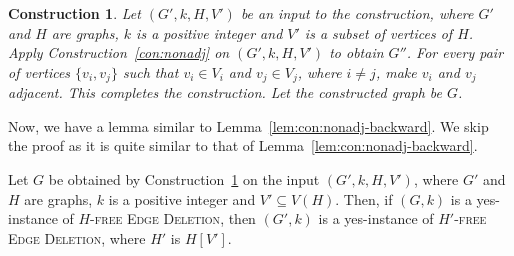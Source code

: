\documentclass[envcountsame,envcountsect,10pt,oribibl]{llncs}
\newcommand{\pname}[1]{\textnormal{\textsc{#1}}}
\newcommand{\HED}{\pname{$H$-free Edge Deletion}}
\newcommand{\HDED}{\pname{$H'$-free Edge Deletion}}
\newtheorem{construction}{Construction}
\begin{document}
\begin{construction}
  \label{con:adj}
  Let $(G',k, H, V')$ be an input to the construction, where $G'$ and $H$ are graphs, $k$
  is a positive integer and $V'$ is a subset of vertices of $H$.
  Apply Construction~\ref{con:nonadj} on $(G',k,H,V')$ to obtain $G''$.
  For every pair of vertices $\{v_i,v_j\}$ such that $v_i\in V_i$ and $v_j\in V_j$, where $i\neq j$,
  make $v_i$ and $v_j$ adjacent.
  This completes the construction. Let the constructed graph be $G$. 
\end{construction}

Now, we have a lemma similar to Lemma~\ref{lem:con:nonadj-backward}. 
We skip the proof as it is quite similar to that of Lemma~\ref{lem:con:nonadj-backward}. 

\begin{lemma}
  \label{lem:con:adj-backward}
  Let $G$ be obtained by Construction~\ref{con:adj} on 
  the input $(G',k,H,V')$, where $G'$ and $H$ are graphs, $k$ is a positive integer and $V'\subseteq V(H)$.
  Then, if $(G,k)$ is a yes-instance of \HED, then $(G',k)$ is a yes-instance of \HDED, where $H'$ is $H[V']$.
\end{lemma}
\end{document}
